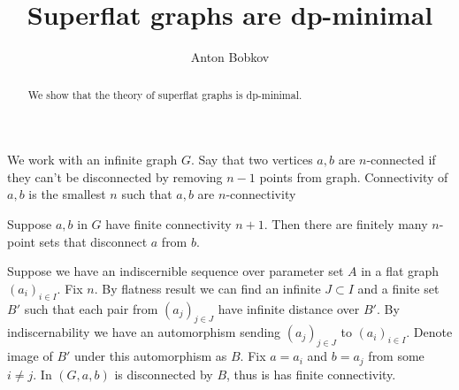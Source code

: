 \documentclass{amsart}
\begin{document}
\title{Superflat graphs are dp-minimal}
\author{Anton Bobkov}

\begin{abstract}
	We show that the theory of superflat graphs is dp-minimal.
\end{abstract}

\maketitle

We work with an infinite graph $G$. Say that two vertices $a, b$ are $n$-connected if they can't be disconnected by removing $n-1$ points from graph. Connectivity of $a,b$ is the smallest $n$ such that $a,b$ are $n$-connectivity

\begin{Lemma}
	Suppose $a,b$ in $G$ have finite connectivity $n+1$. Then there are finitely many $n$-point sets that disconnect $a$ from $b$.
\end{Lemma}

Suppose we have an indiscernible sequence over parameter set $A$ in a flat graph $(a_i)_{i \in I}$. Fix $n$. By flatness result we can find an infinite $J \subset I$ and a finite set $B'$ such that each pair from $(a_j)_{j \in J}$ have infinite distance over $B'$. By indiscernability we have an automorphism sending $(a_j)_{j \in J}$ to $(a_i)_{i \in I}$. Denote image of $B'$ under this automorphism as $B$. Fix $a = a_i$ and $b = a_j$ from some $i \neq j$. In $(G, a, b)$ is disconnected by $B$, thus is has finite connectivity. 
\end{document}
